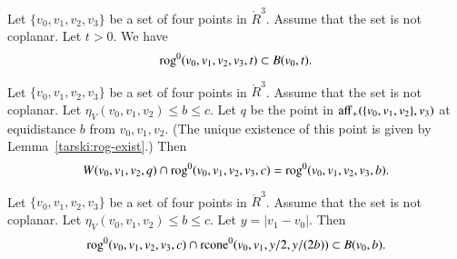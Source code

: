 \begin{tarskidata}
\begin{tarski}

\begin{lemma}
Let $\{v_0,v_1,v_2,v_3\}$ be a set of four points in $\ring{R}^3$.
Assume that the set is not coplanar.
Let $t>0$.  We have
$$
   {\operatorname{rog}}^0(v_0,v_1,v_2,v_3,t) \subset B(v_0,t).
$$
\end{lemma}

\begin{proved}
\swallowed\end{proved}
\end{tarski}





\begin{tarski}

\begin{lemma}
Let $\{v_0,v_1,v_2,v_3\}$ be a set of four points in $\ring{R}^3$.
Assume that the set is not coplanar.
Let $\eta_V(v_0,v_1,v_2) \le b \le c$.  Let $q$ be the point
in ${\operatorname{aff}}_+(\{v_0,v_1,v_2\},v_3)$ at equidistance $b$
from $v_0,v_1,v_2$.  (The unique existence of this point is given
by Lemma~\ref{tarski:rog-exist}.)  Then
$$
W(v_0,v_1,v_2,q) \cap {\operatorname{rog}}^0(v_0,v_1,v_2,v_3,c) = 
  {\operatorname{rog}}^0(v_0,v_1,v_2,v_3,b).
$$
\end{lemma}

\begin{proved}
\swallowed\end{proved}
\end{tarski}





\begin{tarski}

\begin{lemma}
Let $\{v_0,v_1,v_2,v_3\}$ be a set of four points in $\ring{R}^3$.
Assume that the set is not coplanar.
Let $\eta_V(v_0,v_1,v_2)\le b\le c$.  Let $y=|v_1-v_0|$.
Then
$$
{\operatorname{rog}}^0(v_0,v_1,v_2,v_3,c) \cap {\operatorname{rcone}}^0(v_0,v_1,y/2,y/(2b))
\subset B(v_0,b).
$$
\end{lemma}


\end{tarski}
\end{tarskidata}
